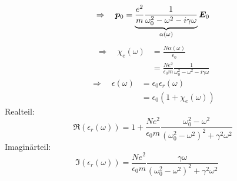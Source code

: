 \begin{equation*}
\Rightarrow \quad \bm{p}_0 = \underbrace{\frac{e^2}{m} \frac{1}{\omega_0^2 - \omega^2 - i \gamma \omega}}_{\alpha (\omega)} \bm{E}_0
\end{equation*}
\begin{align*}
\Rightarrow \quad \chi_e(\omega) &= \frac{N \alpha(\omega)}{\epsilon_0} \\
&= \frac{N e^2}{\epsilon_0 m} \frac{1}{\omega_0^2 - \omega^2 - i \gamma \omega}
\end{align*}
\begin{align*}
\Rightarrow \quad \epsilon(\omega) &= \epsilon_0 \epsilon_r(\omega) \\
&= \epsilon_0 (1 + \chi_e(\omega))
\end{align*}
\noindent
Realteil:
$$ \Re(\epsilon_r(\omega)) = 1 + \frac{Ne^2}{\epsilon_0 m} \frac{\omega_0^2 - \omega^2}{(\omega_0^2 - \omega^2)^2 + \gamma^2 \omega^2} $$
Imaginärteil:
$$ \Im(\epsilon_r(\omega)) = \frac{N e^2}{\epsilon_0 m} \frac{\gamma \omega}{(\omega_0^2 - \omega^2)^2 + \gamma^2 \omega^2} \quad \ \  $$
